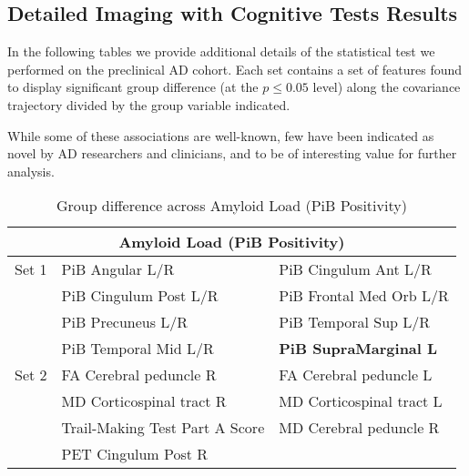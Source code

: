 \subsection*{Detailed Imaging with Cognitive Tests Results}
In the following tables we provide additional details of the statistical test we performed on the preclinical AD cohort. Each set contains a set of features found to display significant group difference (at the $p \leq 0.05$ level) along the covariance trajectory divided by the group variable indicated.

While some of these associations are well-known, few have been indicated as novel by AD researchers and clinicians, and to be of interesting value for further analysis. 

\begin{table}
	\centering
	\begin{tabular}{p{0.8cm}p{5.5cm}p{6cm}}
		\toprule
		\multicolumn{3}{c}{\textbf{Amyloid Load (PiB Positivity)}}\\ \midrule \midrule
		Set 1 & PiB Angular L/R & PiB Cingulum Ant L/R \\
		& PiB Cingulum Post L/R & PiB Frontal Med Orb L/R \\
		& PiB Precuneus L/R & PiB Temporal Sup L/R \\
		& PiB Temporal Mid L/R & \textbf{PiB SupraMarginal L} \\
		\midrule
		Set 2     & FA Cerebral peduncle R   & FA Cerebral peduncle L	\\
		& MD Corticospinal tract R	& MD Corticospinal tract L		\\
			     & Trail-Making Test Part A Score  & MD Cerebral peduncle R \\ 
			    &PET Cingulum Post R  &  \\ \midrule\bottomrule
	\end{tabular}
	\caption{Group difference across Amyloid Load (PiB Positivity)}
\end{table}

